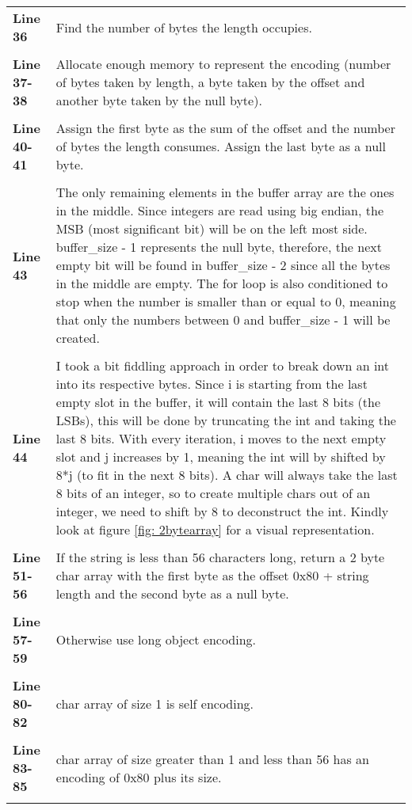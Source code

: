 \documentclass[a4paper, 12pt, titlepage]{article}
\begin{document}
\begin{onehalfspacing}
\begin{longtable}{l p{10cm}}
    \textbf{Line 36} & Find the number of bytes the length occupies. \\ \\
    \textbf{Line 37-38} & Allocate enough memory to represent the encoding (number of bytes taken by length, a byte taken by the offset and another byte taken by the null byte). \\ \\
    \textbf{Line 40-41} & Assign the first byte as the sum of the offset and the number of bytes the length consumes. Assign the last byte as a null byte. \\ \\
    \textbf{Line 43} & The only remaining elements in the buffer array are the ones in the middle. Since integers are read using big endian, the MSB (most significant bit) will be on the left most side. buffer\_size - 1 represents the null byte, therefore, the next empty bit will be found in buffer\_size - 2 since all the bytes in the middle are empty. The for loop is also conditioned to stop when the number is smaller than or equal to 0, meaning that only the numbers between 0 and buffer\_size - 1 will be created.\\ \\
    \textbf{Line 44} & I took a bit fiddling approach in order to break down an int into its respective bytes. Since i is starting from the last empty slot in the buffer, it will contain the last 8 bits (the LSBs), this will be done by truncating the int and taking the last 8 bits. With every iteration, i moves to the next empty slot and j increases by 1, meaning the int will by shifted by 8*j (to fit in the next 8 bits). A char will always take the last 8 bits of an integer, so to create multiple chars out of an integer, we need to shift by 8 to deconstruct the int. Kindly look at figure \ref{fig: 2bytearray} for a visual representation.\\ \\
    \textbf{Line 51-56} & If the string is less than 56 characters long, return a 2 byte char array with the first byte as the offset 0x80 + string length and the second byte as a null byte. \\ \\
    \textbf{Line 57-59} & Otherwise use long object encoding. \\ \\
    \textbf{Line 80-82} & char array of size 1 is self encoding. \\ \\
    \textbf{Line 83-85} & char array of size greater than 1 and less than 56 has an encoding of 0x80 plus its size. \\ \\

\end{longtable}
\end{onehalfspacing}
\end{document}

